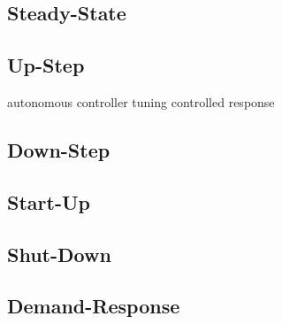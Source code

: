 \subsection{Steady-State}

\subsection{Up-Step}
autonomous
controller tuning
controlled response


\subsection{Down-Step}

\subsection{Start-Up}

\subsection{Shut-Down}

\subsection{Demand-Response}